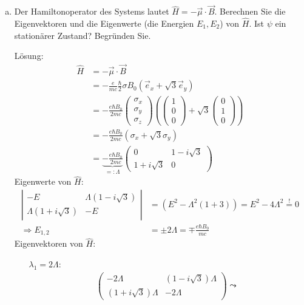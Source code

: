 \documentclass{scrartcl}
\begin{document}
\begin{enumerate}[a)]
\item Der Hamiltonoperator des Systems lautet $\hat H = - \vec \mu \cdot \vec B$. Berechnen Sie die Eigenvektoren und die Eigenwerte (die Energien $E_1, E_2$) von $\hat H$. Ist $\psi$ ein stationärer Zustand? Begründen Sie.
\item[Lösung:]
\begin{align*}
\hat H  &= -\vec \mu \cdot \vec B \\
	&= -\frac{e}{mc} \frac \hbar 2 \sigma B_0(\vec e_x +\sqrt 3 \vec e_y) \\
	&= -\frac{e\hbar B_0}{2mc}\begin{pmatrix}
	\sigma_x\\\sigma_y\\\sigma_z
	\end{pmatrix}
	\left(\begin{pmatrix}1\\0\\0\end{pmatrix} + \sqrt 3 \begin{pmatrix}0\\1\\0\end{pmatrix}\right) \\
 	&=  -\frac{e\hbar B_0}{2 mc}(\sigma_x + \sqrt 3 \sigma_y)\\
 	&= \underbrace{-\frac{e\hbar B_0}{2 mc}}_{=:\Lambda}\begin{pmatrix}
 	0 & 1-i\sqrt 3 \\ 1+i\sqrt 3 & 0
 	\end{pmatrix}
\end{align*}
Eigenwerte von $\hat H$:
\begin{align*}
\left|\begin{matrix}
-E & \Lambda(1-i\sqrt 3)  \\ \Lambda(1+i\sqrt 3) & -E
\end{matrix}\right| &= (E^2 - \Lambda^2(1+3))
		= E^2 -4\Lambda^2 \overset{!}{=} 0 \\
	\Rightarrow E_{1,2} &= \pm 2\Lambda = \mp \frac{e\hbar B_0}{mc}
\end{align*}
Eigenvektoren von $\hat H$:
\begin{itemize}
\item [$\lambda_1 = 2\Lambda$:]
\begin{align*}
\begin{pmatrix}
-2\Lambda & (1-i\sqrt 3)\Lambda \\(1+i\sqrt 3)\Lambda & -2\Lambda
\end{pmatrix} \leadsto

\end{align*}
\end{itemize}
\end{enumerate}
\end{document}
